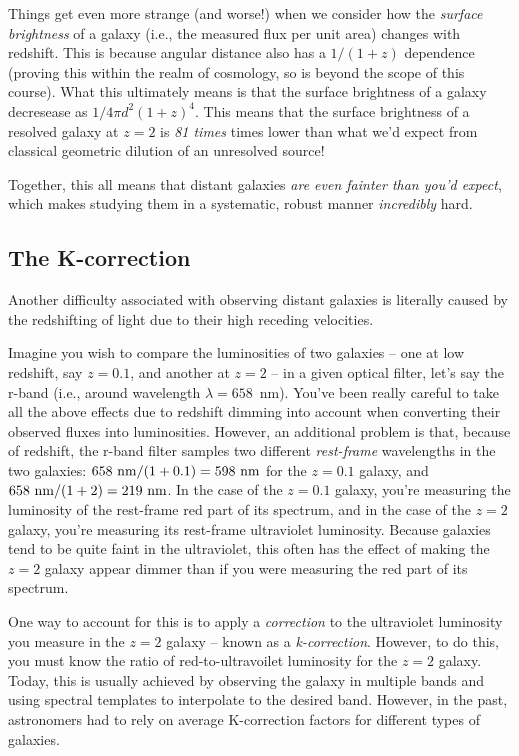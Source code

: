 \documentclass[11pt]{article}
\begin{document}
Things get even more strange (and worse!) when we consider how the
{\it surface brightness} of a galaxy (i.e., the measured flux per unit
area) changes with redshift. This is because angular distance also has
a $1/(1+z)$ dependence (proving this within the realm of cosmology, so
is beyond the scope of this course). What this ultimately means is
that the surface brightness of a galaxy decresease as
$1/4\pi d^2(1+z)^4$. This means that the surface brightness of a
resolved galaxy at $z=2$ is {\it 81 times} times lower than what we'd
expect from classical geometric dilution of an unresolved source!

Together, this all means that distant galaxies {\it are
  even fainter than you'd expect}, which makes studying them in a
systematic, robust manner {\it incredibly} hard.

\subsection{The K-correction}
Another difficulty associated with observing distant galaxies is
literally caused by the redshifting of light due to their high
receding velocities.

Imagine you wish to compare the luminosities of two galaxies -- one at
low redshift, say $z=0.1$, and another at $z=2$ -- in a given optical
filter, let's say the r-band (i.e., around wavelength
$\lambda=658$~nm). You've been really careful to take all the above
effects due to redshift dimming into account when converting their
observed fluxes into luminosities. However, an additional problem is
that, because of redshift, the r-band filter samples two different
{\it rest-frame} wavelengths in the two galaxies:
$658~{\rm nm}/(1+0.1)=598~{\rm nm}$ for the $z=0.1$ galaxy, and
$658~{\rm nm}/(1+2)=219~{\rm nm}$. In the case of the $z=0.1$ galaxy,
you're measuring the luminosity of the rest-frame red part of its
spectrum, and in the case of the $z=2$ galaxy, you're measuring its
rest-frame ultraviolet luminosity. Because galaxies tend to be
quite faint in the ultraviolet, this often has the effect of making
the $z=2$ galaxy appear dimmer than if you were measuring the red part
of its spectrum.

One way to account for this is to apply a {\it correction} to the
ultraviolet luminosity you measure in the $z=2$ galaxy -- known as a
{\it k-correction}. However, to do this, you must know the ratio of
red-to-ultravoilet luminosity for the $z=2$ galaxy. Today, this is
usually achieved by observing the galaxy in multiple bands and using
spectral templates to interpolate to the desired band. However, in the
past, astronomers had to rely on average K-correction factors for
different types of galaxies.
\end{document}
